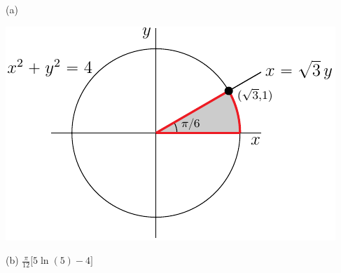 %

\begin{answer}
(a)
\begin{center}
     \includegraphics{fig/OE13D_5a.pdf}
\end{center}

(b) $\frac{\pi}{12}\big[5\ln(5)-4\big]$
\end{answer}

